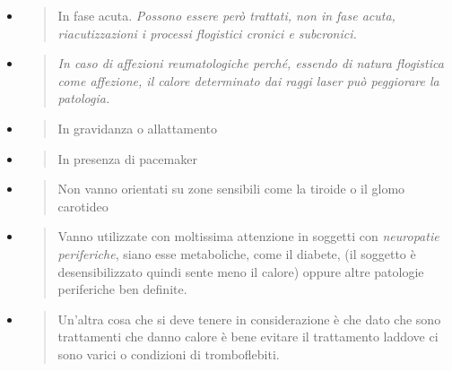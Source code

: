 \documentclass[]{article}
\begin{document}
\begin{itemize}
\item
  \begin{quote}
  In fase acuta. \emph{Possono essere però trattati, non in fase acuta,
  riacutizzazioni i processi flogistici cronici e subcronici.}
  \end{quote}
\item
  \begin{quote}
  \emph{In caso di affezioni reumatologiche perché, essendo di natura
  flogistica come affezione, il calore determinato dai raggi laser può
  peggiorare la patologia.}
  \end{quote}
\item
  \begin{quote}
  In gravidanza o allattamento
  \end{quote}
\item
  \begin{quote}
  In presenza di pacemaker
  \end{quote}
\item
  \begin{quote}
  Non vanno orientati su zone sensibili come la tiroide o il glomo
  carotideo
  \end{quote}
\item
  \begin{quote}
  Vanno utilizzate con moltissima attenzione in soggetti con
  \emph{neuropatie periferiche}, siano esse metaboliche, come il
  diabete, (il soggetto è desensibilizzato quindi sente meno il calore)
  oppure altre patologie periferiche ben definite.
  \end{quote}
\item
  \begin{quote}
  Un'altra cosa che si deve tenere in considerazione è che dato che sono
  trattamenti che danno calore è bene evitare il trattamento laddove ci
  sono varici o condizioni di tromboflebiti.
  \end{quote}
\end{itemize}
\end{document}
